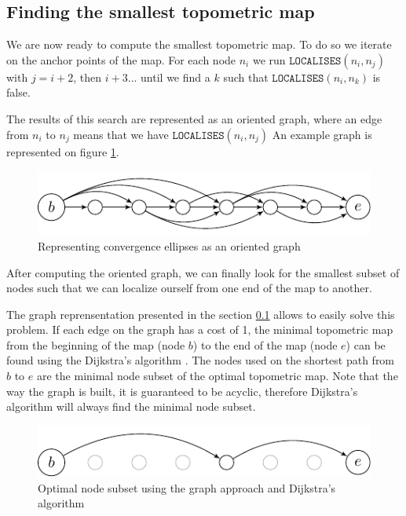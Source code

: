 \documentclass[letterpaper,10 pt,conference]{ieeeconf}
\begin{document}
\subsection{Finding the smallest topometric map}
\label{matching-readings} 

We are now ready to compute the smallest topometric map. To do so we iterate on
the anchor points of the map. For each node $n_i$ we run
$\texttt{LOCALISES}(n_i,n_j)$ with $j = i + 2$, then $i + 3$... until we find a
$k$ such that $\texttt{LOCALISES}(n_i, n_k)$ is false.

The results of this search are represented as an oriented graph, where an edge
from $n_{i}$ to $n_{j}$ means that we have $\texttt{LOCALISES}(n_i, n_j)$ An
example graph is represented on figure \ref{graph_unoptimized}.


\begin{figure}[thpb]
  \centering
  \includegraphics[scale=1.0]{unoptimized-graph}
  \caption{Representing convergence ellipses as an oriented graph}
  \label{graph_unoptimized}
\end{figure}

After computing the oriented graph, we can finally look for the smallest subset
of nodes such that we can localize ourself from one end of the map to another.

The graph reprensentation presented in the section \ref{matching-readings} allows to easily solve
this problem. If each edge on the graph has a cost of 1, the minimal topometric map from the
beginning of the map (node $b$) to the end of the map (node $e$) can be found using the Dijkstra's
algorithm \cite{dijkstra}. The nodes used on the shortest path from $b$ to $e$ are the minimal node
subset of the optimal topometric map. Note that the way the graph is built, it is guaranteed to be
acyclic, therefore Dijkstra's algorithm will always find the minimal node subset.


\begin{figure}[thpb]
  \centering
  \includegraphics[scale=1.0]{optimized-graph}
  \caption{Optimal node subset using the graph approach and Dijkstra's algorithm}
\end{figure}
\end{document}
